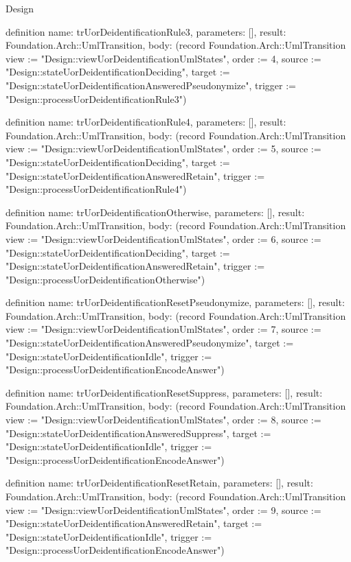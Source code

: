 \begin{lexlean}{Design}
\begin{semanticmodule}
definition{
  name: trUorDeidentificationRule3,
  parameters: [],
  result: Foundation.Arch::UmlTransition,
  body: (record Foundation.Arch::UmlTransition {view := "Design::viewUorDeidentificationUmlStates", order := 4, source := "Design::stateUorDeidentificationDeciding", target := "Design::stateUorDeidentificationAnsweredPseudonymize", trigger := "Design::processUorDeidentificationRule3"})
}

definition{
  name: trUorDeidentificationRule4,
  parameters: [],
  result: Foundation.Arch::UmlTransition,
  body: (record Foundation.Arch::UmlTransition {view := "Design::viewUorDeidentificationUmlStates", order := 5, source := "Design::stateUorDeidentificationDeciding", target := "Design::stateUorDeidentificationAnsweredRetain", trigger := "Design::processUorDeidentificationRule4"})
}

definition{
  name: trUorDeidentificationOtherwise,
  parameters: [],
  result: Foundation.Arch::UmlTransition,
  body: (record Foundation.Arch::UmlTransition {view := "Design::viewUorDeidentificationUmlStates", order := 6, source := "Design::stateUorDeidentificationDeciding", target := "Design::stateUorDeidentificationAnsweredRetain", trigger := "Design::processUorDeidentificationOtherwise"})
}

definition{
  name: trUorDeidentificationResetPseudonymize,
  parameters: [],
  result: Foundation.Arch::UmlTransition,
  body: (record Foundation.Arch::UmlTransition {view := "Design::viewUorDeidentificationUmlStates", order := 7, source := "Design::stateUorDeidentificationAnsweredPseudonymize", target := "Design::stateUorDeidentificationIdle", trigger := "Design::processUorDeidentificationEncodeAnswer"})
}

definition{
  name: trUorDeidentificationResetSuppress,
  parameters: [],
  result: Foundation.Arch::UmlTransition,
  body: (record Foundation.Arch::UmlTransition {view := "Design::viewUorDeidentificationUmlStates", order := 8, source := "Design::stateUorDeidentificationAnsweredSuppress", target := "Design::stateUorDeidentificationIdle", trigger := "Design::processUorDeidentificationEncodeAnswer"})
}

definition{
  name: trUorDeidentificationResetRetain,
  parameters: [],
  result: Foundation.Arch::UmlTransition,
  body: (record Foundation.Arch::UmlTransition {view := "Design::viewUorDeidentificationUmlStates", order := 9, source := "Design::stateUorDeidentificationAnsweredRetain", target := "Design::stateUorDeidentificationIdle", trigger := "Design::processUorDeidentificationEncodeAnswer"})
}


\end{semanticmodule}
\end{lexlean}
